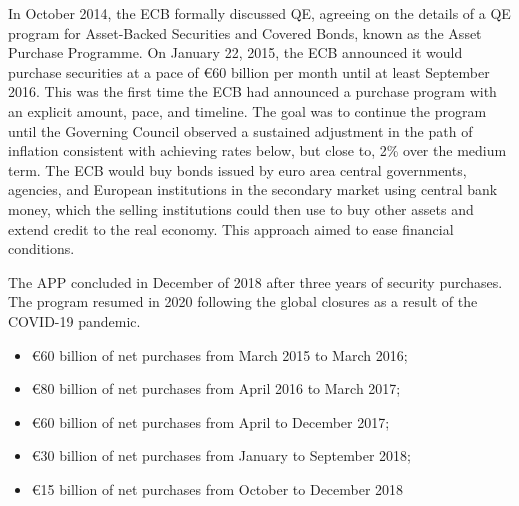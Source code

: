 In October 2014, the ECB formally discussed QE, agreeing on the details of a QE program for Asset-Backed Securities and Covered Bonds, known as the Asset Purchase Programme. On January 22, 2015, the ECB announced it would purchase securities at a pace of €60 billion per month until at least September 2016. This was the first time the ECB had announced a purchase program with an explicit amount, pace, and timeline. The goal was to continue the program until the Governing Council observed a sustained adjustment in the path of inflation consistent with achieving rates below, but close to, 2\% over the medium term. The ECB would buy bonds issued by euro area central governments, agencies, and European institutions in the secondary market using central bank money, which the selling institutions could then use to buy other assets and extend credit to the real economy. This approach aimed to ease financial conditions. 

The APP concluded in December of 2018 after three years of security purchases. The program resumed in 2020 following the global closures as a result of the COVID-19 pandemic. 

\begin{itemize}
    \item €60 billion of net purchases from March 2015 to March 2016;
    \item €80 billion of net purchases from April 2016 to March 2017;
    \item €60 billion of net purchases from April to December 2017;
    \item €30 billion of net purchases from January to September 2018;
    \item €15 billion of net purchases from October to December 2018
\end{itemize}

 
